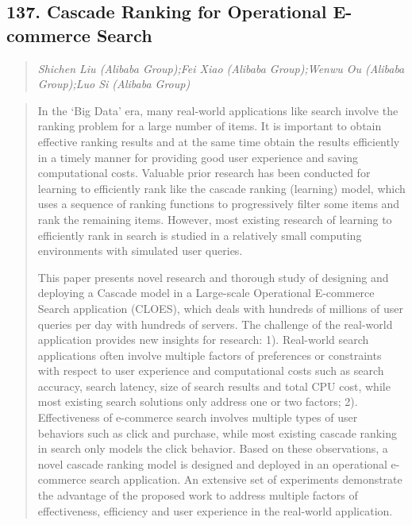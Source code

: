 \documentclass{article}
\begin{document}
\subsection{137. Cascade Ranking for Operational E-commerce Search}

\begin{quote}
\footnotesize{\textit{Shichen Liu (Alibaba Group);Fei Xiao (Alibaba Group);Wenwu Ou (Alibaba Group);Luo Si (Alibaba Group)}}

\end{quote}

\begin{quote}
In the ‘Big Data’ era, many real-world applications like search involve the ranking problem for a large number of items. It is important to obtain effective ranking results and at the same time obtain the results efficiently in a timely manner for providing good user experience and saving computational costs. Valuable prior research has been conducted for learning to efficiently rank like the cascade ranking (learning) model, which uses a sequence of ranking functions to progressively filter some items and rank the remaining items. However, most existing research of learning to efficiently rank in search is studied in a relatively small computing environments with simulated user queries.







  This paper presents novel research and thorough study of designing and deploying a Cascade model in a Large-scale Operational E-commerce Search application (CLOES), which deals with hundreds of millions of user queries per day with hundreds of servers. The challenge of the real-world application provides new insights for research: 1). Real-world search applications often involve multiple factors of preferences or constraints with respect to user experience and computational costs such as search accuracy, search latency, size of search results and total CPU cost, while most existing search solutions only address one or two factors; 2). Effectiveness of e-commerce search involves multiple types of user behaviors such as click and purchase, while most existing cascade ranking in search only models the click behavior. Based on these observations, a novel cascade ranking model is designed and deployed in an operational e-commerce search application. An extensive set of experiments demonstrate the advantage of the proposed work to address multiple factors of effectiveness, efficiency and user experience in the real-world application.
\end{quote}
\end{document}

